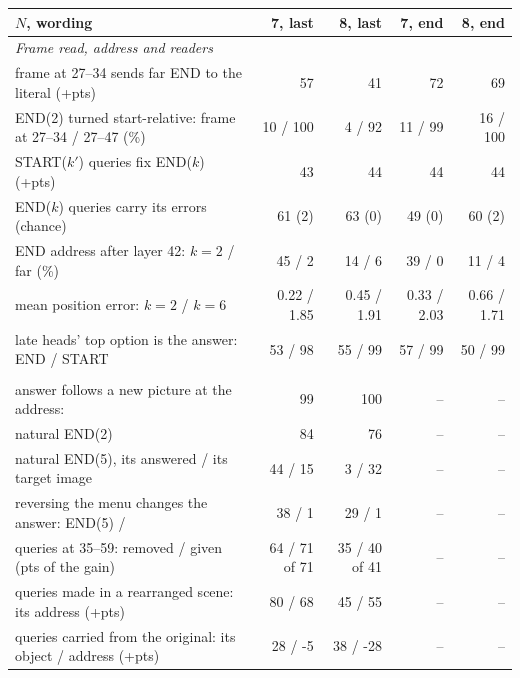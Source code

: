 \begin{tabular}{lrrrr}
\toprule
$N$, wording & 7, last & 8, last & 7, end & 8, end \\
\midrule
\multicolumn{5}{l}{\textit{Frame read, address and readers}} \\
frame at 27--34 sends far END to the literal (+pts) & 57 & 41 & 72 & 69 \\
END(2) turned start-relative: frame at 27--34 / 27--47 (\%) & 10 / 100 & 4 / 92 & 11 / 99 & 16 / 100 \\
START($k'$) queries fix END($k$) (+pts) & 43 & 44 & 44 & 44 \\
END($k$) queries carry its errors (chance) & 61 (2) & 63 (0) & 49 (0) & 60 (2) \\
END address after layer 42: $k=2$ / far (\%) & 45 / 2 & 14 / 6 & 39 / 0 & 11 / 4 \\
mean position error: $k=2$ / $k=6$ & 0.22 / 1.85 & 0.45 / 1.91 & 0.33 / 2.03 & 0.66 / 1.71 \\
late heads' top option is the answer: END / START & 53 / 98 & 55 / 99 & 57 / 99 & 50 / 99 \\
\addlinespace
\multicolumn{5}{l}{\textit{Readout locked to a position, and the repair}} \\
answer follows a new picture at the address: \rthree{} & 99 & 100 & -- & -- \\
\quad natural END(2) & 84 & 76 & -- & -- \\
\quad natural END(5), its answered / its target image & 44 / 15 & 3 / 32 & -- & -- \\
reversing the menu changes the answer: END(5) / \rthree{} & 38 / 1 & 29 / 1 & -- & -- \\
\rthree{} queries at 35--59: removed / given (pts of the gain) & 64 / 71 of 71 & 35 / 40 of 41 & -- & -- \\
\rthree{} queries made in a rearranged scene: its address (+pts) & 80 / 68 & 45 / 55 & -- & -- \\
\rthree{} queries carried from the original: its object / address (+pts) & 28 / -5 & 38 / -28 & -- & -- \\
\bottomrule
\end{tabular}
